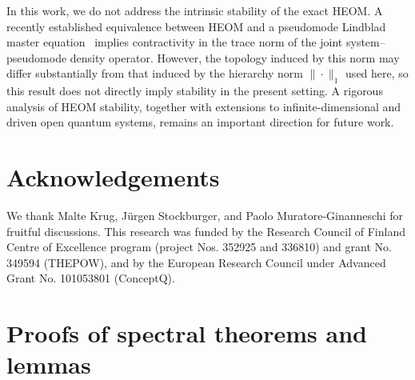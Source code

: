 \documentclass{SciPost}
\begin{document}
In this work, we do not address the intrinsic stability of the exact HEOM. A recently established equivalence between HEOM and a pseudomode Lindblad master equation~\cite{Mueller2026} implies contractivity in the trace norm of the joint system--pseudomode density operator. However, the topology induced by this norm may differ substantially from that induced by the hierarchy norm $\|\cdot\|_1$ used here, so this result does not directly imply stability in the present setting. A rigorous analysis of HEOM stability, together with extensions to infinite-dimensional and driven open quantum systems, remains an important direction for future work.

\section*{Acknowledgements}
We thank Malte Krug, J\"urgen Stockburger, and Paolo Muratore-Ginanneschi for fruitful discussions.
This research was funded by the Research Council of Finland Centre of Excellence program (project Nos. 352925 and 336810) and grant No. 349594 (THEPOW), and by the European Research Council under Advanced Grant No. 101053801 (ConceptQ).

\appendix
{}

\section{Proofs of spectral theorems and lemmas}
\end{document}

